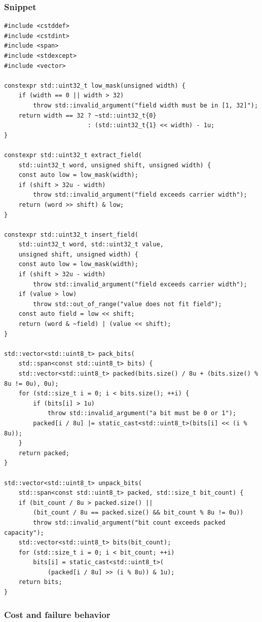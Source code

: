 \subsubsection{Snippet}\label{appendix-4e2236f53445-snippet}

\begin{verbatim}
#include <cstddef>
#include <cstdint>
#include <span>
#include <stdexcept>
#include <vector>

constexpr std::uint32_t low_mask(unsigned width) {
    if (width == 0 || width > 32)
        throw std::invalid_argument("field width must be in [1, 32]");
    return width == 32 ? ~std::uint32_t{0}
                       : (std::uint32_t{1} << width) - 1u;
}

constexpr std::uint32_t extract_field(
    std::uint32_t word, unsigned shift, unsigned width) {
    const auto low = low_mask(width);
    if (shift > 32u - width)
        throw std::invalid_argument("field exceeds carrier width");
    return (word >> shift) & low;
}

constexpr std::uint32_t insert_field(
    std::uint32_t word, std::uint32_t value,
    unsigned shift, unsigned width) {
    const auto low = low_mask(width);
    if (shift > 32u - width)
        throw std::invalid_argument("field exceeds carrier width");
    if (value > low)
        throw std::out_of_range("value does not fit field");
    const auto field = low << shift;
    return (word & ~field) | (value << shift);
}

std::vector<std::uint8_t> pack_bits(
    std::span<const std::uint8_t> bits) {
    std::vector<std::uint8_t> packed(bits.size() / 8u + (bits.size() % 8u != 0u), 0u);
    for (std::size_t i = 0; i < bits.size(); ++i) {
        if (bits[i] > 1u)
            throw std::invalid_argument("a bit must be 0 or 1");
        packed[i / 8u] |= static_cast<std::uint8_t>(bits[i] << (i % 8u));
    }
    return packed;
}

std::vector<std::uint8_t> unpack_bits(
    std::span<const std::uint8_t> packed, std::size_t bit_count) {
    if (bit_count / 8u > packed.size() ||
        (bit_count / 8u == packed.size() && bit_count % 8u != 0u))
        throw std::invalid_argument("bit count exceeds packed capacity");
    std::vector<std::uint8_t> bits(bit_count);
    for (std::size_t i = 0; i < bit_count; ++i)
        bits[i] = static_cast<std::uint8_t>(
            (packed[i / 8u] >> (i % 8u)) & 1u);
    return bits;
}
\end{verbatim}

\subsubsection{Cost and failure behavior}\label{appendix-4e2236f53445-cost-and-failure-behavior}

